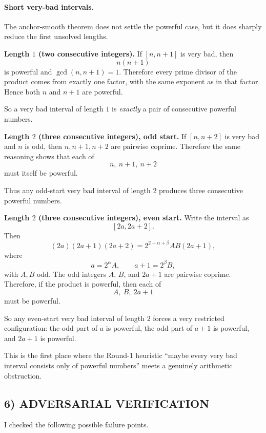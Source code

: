 \paragraph{Short very-bad intervals.}
The anchor-smooth theorem does not settle the powerful case, but it does sharply reduce the first unsolved lengths.

\medskip

\noindent\textbf{Length $1$ (two consecutive integers).}
If $[n,n+1]$ is very bad, then
\[
n(n+1)
\]
is powerful and $\gcd(n,n+1)=1$. Therefore every prime divisor of the product comes from exactly one factor, with the same exponent as in that factor. Hence both $n$ and $n+1$ are powerful.

So a very bad interval of length $1$ is \emph{exactly} a pair of consecutive powerful numbers.

\medskip

\noindent\textbf{Length $2$ (three consecutive integers), odd start.}
If $[n,n+2]$ is very bad and $n$ is odd, then $n,n+1,n+2$ are pairwise coprime. Therefore the same reasoning shows that each of
\[
n,\ n+1,\ n+2
\]
must itself be powerful.

Thus any odd-start very bad interval of length $2$ produces three consecutive powerful numbers.

\medskip

\noindent\textbf{Length $2$ (three consecutive integers), even start.}
Write the interval as
\[
[2a,2a+2].
\]
Then
\[
(2a)(2a+1)(2a+2)=2^{2+\alpha+\beta}AB(2a+1),
\]
where
\[
a=2^{\alpha}A,\qquad a+1=2^{\beta}B,
\]
with $A,B$ odd. The odd integers $A$, $B$, and $2a+1$ are pairwise coprime. Therefore, if the product is powerful, then each of
\[
A,\ B,\ 2a+1
\]
must be powerful.

So any even-start very bad interval of length $2$ forces a very restricted configuration:
the odd part of $a$ is powerful, the odd part of $a+1$ is powerful, and $2a+1$ is powerful.

This is the first place where the Round-1 heuristic ``maybe every very bad interval consists only of powerful numbers'' meets a genuinely arithmetic obstruction.

\subsection*{6) ADVERSARIAL VERIFICATION}

I checked the following possible failure points.

